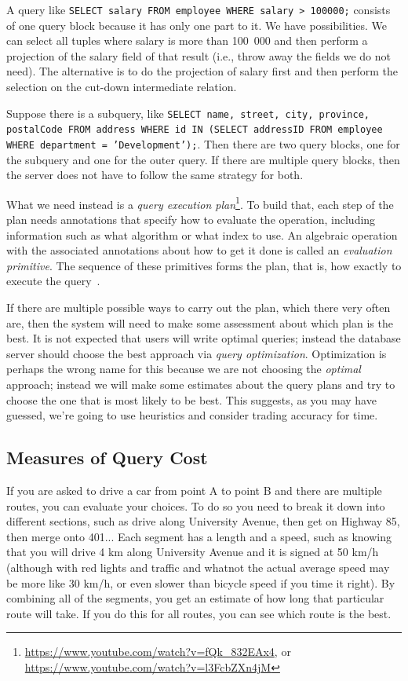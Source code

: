 A query like \texttt{SELECT salary FROM employee WHERE salary > 100000;} consists of one query block because it has only one part to it. We have possibilities. We can select all tuples where salary is more than 100~000 and then perform a projection of the salary field of that result (i.e., throw away the fields we do not need). The alternative is to do the projection of salary first and then perform the selection on the cut-down intermediate relation.

Suppose there is a subquery, like \texttt{SELECT name, street, city, province, postalCode FROM address WHERE id IN (SELECT addressID FROM employee WHERE department = 'Development');}. Then there are two query blocks, one for the subquery and one for the outer query. If there are multiple query blocks, then the server does not have to follow the same strategy for both.

What we need instead is a \textit{query execution plan}\footnote{\url{https://www.youtube.com/watch?v=fQk_832EAx4}, or \url{https://www.youtube.com/watch?v=l3FcbZXn4jM}}. To build that, each step of the plan needs annotations that specify how to evaluate the operation, including information such as what algorithm or what index to use. An algebraic operation with the associated annotations about how to get it done is called an \textit{evaluation primitive}. The sequence of these primitives forms the plan, that is, how exactly to execute the query~\cite{dsc}. 

If there are multiple possible ways to carry out the plan, which there very often are, then the system will need to make some assessment about which plan is the best. It is not expected that users will write optimal queries; instead the database server should choose the best approach via \textit{query optimization}. Optimization is perhaps the wrong name for this because we are not choosing the \textit{optimal} approach; instead we will make some estimates about the query plans and try to choose the one that is most likely to be best. This suggests, as you may have guessed, we're going to use heuristics and consider trading accuracy for time.

\subsection*{Measures of Query Cost}

If you are asked to drive a car from point A to point B and there are multiple routes, you can evaluate your choices. To do so you need to break it down into different sections, such as drive along University Avenue, then get on Highway 85, then merge onto 401... Each segment has a length and a speed, such as knowing that you will drive 4 km along University Avenue and it is signed at 50 km/h (although with red lights and traffic and whatnot the actual average speed may be more like 30 km/h, or even slower than bicycle speed if you time it right). By combining all of the segments, you get an estimate of how long that particular route will take. If you do this for all routes, you can see which route is the best. 

